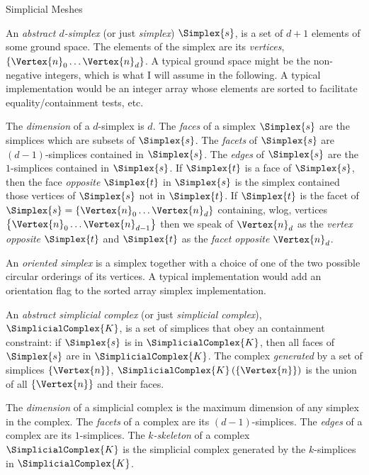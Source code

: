 \begin{plSection}{Simplicial Meshes}
\label{sec:simplicial-meshes}

An {\it abstract $d$-simplex} (or just {\it simplex})
$\Simplex{s}$, is a set of $d+1$ elements of some ground space.
The elements of the simplex are its {\it vertices}, 
$\left\{ \Vertex{n}_0 \ldots \Vertex{n}_d \right\}$.
A typical ground space might be the non-negative integers,
which is what I will assume in the following.
A typical implementation would be an integer array
whose elements are sorted to facilitate equality/containment tests, etc.

The {\it dimension} of a $d$-simplex is $d$.
The {\it faces} of a simplex $\Simplex{s}$ are the simplices which are subsets of $\Simplex{s}$.
The {\it facets} of $\Simplex{s}$ are $(d-1)$-simplices contained in $\Simplex{s}$.
The {\it edges} of $\Simplex{s}$ are the $1$-simplices contained in $\Simplex{s}$.
If $\Simplex{t}$ is a face of $\Simplex{s}$,
then the face {\it opposite} $\Simplex{t}$ in $\Simplex{s}$
is the simplex contained those vertices of $\Simplex{s}$
not in $\Simplex{t}$.
If $\Simplex{t}$ is the facet of $\Simplex{s} = \left\{ \Vertex{n}_0 \ldots \Vertex{n}_d \right\}$
containing, wlog, vertices $\left\{ \Vertex{n}_0 \ldots \Vertex{n}_{d-1} \right\}$
then we speak of $\Vertex{n}_d$ as the {\it vertex opposite} $\Simplex{t}$
and $\Simplex{t}$ as the {\it facet opposite} $\Vertex{n}_d$.

An {\it oriented simplex} is a simplex together with a choice
of one of the two possible circular orderings of its vertices.
A typical implementation would add an orientation flag
to the sorted array simplex implementation.

An {\it abstract simplicial complex} (or just {\it simplicial complex}),
$\SimplicialComplex{K}$, is a set of simplices
that obey an containment constraint:
if $\Simplex{s}$ is in $\SimplicialComplex{K}$, 
then all faces of $\Simplex{s}$ are in $\SimplicialComplex{K}$.
The complex {\it generated} by a set of simplices $\left\{ \Vertex{n} \right\}$,
$\SimplicialComplex{K} \left( \left\{ \Vertex{n} \right\} \right)$ 
is the union of all $\left\{ \Vertex{n} \right\}$
and their faces.

The {\it dimension} of a simplicial complex is the maximum dimension
of any simplex in the complex.
The {\it facets} of a complex are its $(d-1)$-simplices.
The {\it edges} of a complex are its $1$-simplices.
The {\it $k$-skeleton} of a complex $\SimplicialComplex{K}$
is the simplicial complex generated by the $k$-simplices in $\SimplicialComplex{K}$.


\end{plSection}
